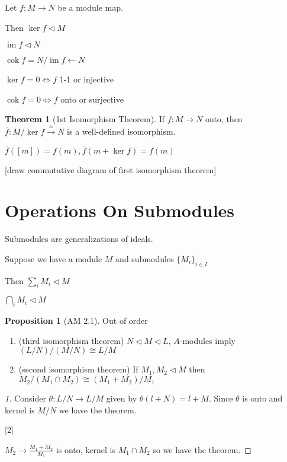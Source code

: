 \documentclass{article}
\theoremstyle{definition}
\newtheorem{theorem}{Theorem}
\newtheorem{proposition}{Proposition}
\begin{document}
Let \(f : M \to N\) be a module map.

Then \(\ker f \triangleleft M\)

\(\operatorname{im}f \triangleleft N \)

\(\operatorname{cok}f = N / \operatorname{im}f \leftarrow N\) 

\(\ker f = 0 \iff f\) 1-1 or injective

\(\operatorname{cok} f = 0 \iff f \) onto or surjective

\begin{theorem}
    [1st Isomorphism Theorem]

    If \(f:M \to N\) onto, then \(\overline{f}:M / \ker f \overset{\approx}{\longrightarrow} N \) is a well-defined isomorphism.
    
    \(\overline{f}([m])=f(m),\overline{f}(m+\ker f)=f(m) \) 
\end{theorem}

[draw commutative diagram of first isomorphism theorem]

\section*{Operations On Submodules}

Submodules are generalizations of ideals.

Suppose we have a module \(M\) and submodules \(\{ M_i \} _{i\in I}\) 

Then \(\sum_{i} M_i \triangleleft M\)

\(\bigcap_i M_i \triangleleft M \) 

\begin{proposition}
    [AM 2.1]

    Out of order

    \begin{enumerate}
        \item (third isomorphism theorem) \(N \triangleleft M \triangleleft L\), \(A\)-modules imply \((L / N) / (M / N) \cong L / M\)  
        \item (second isomorphism theorem) If \(M_1, M_2 \triangleleft M\) then \(M_2 / (M_1 \cap M_2) \cong (M_1 + M_2) / M_1\) 
    \end{enumerate}
\end{proposition}

\begin{proof}
    [1]

    Consider \(\theta : L / N \to L / M\) given by \(\theta (l + N) = l + M\). Since \(\theta \) is onto and kernel is \(M / N\) we have the theorem.
    
    [2]

    \(M_2 \to \frac{M_1 + M_2}{M_1}\) is onto, kernel is \(M_1 \cap M_2\) so we have the theorem.
\end{proof}
\end{document}
